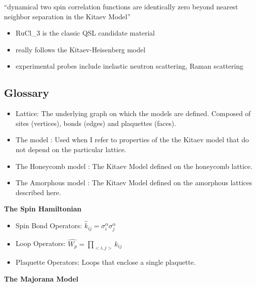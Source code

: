 ``dynamical two spin correlation functions are identically zero beyond nearest neighbor separation in the Kitaev Model''~\autocite{baskaranExactResultsSpin2007}

\begin{itemize}
\tightlist
\item
  RuCl\_3 is the classic QSL candidate material
\item
  really follows the Kitaev-Heisenberg model
\item
  experimental probes include inelastic neutron scattering, Raman scattering
\end{itemize}

\hypertarget{glossary}{%
\subsection{Glossary}\label{glossary}}

\begin{itemize}
\item
  Lattice: The underlying graph on which the models are defined. Composed of sites (vertices), bonds (edges) and plaquettes (faces).
\item
  The model : Used when I refer to properties of the the Kitaev model that do not depend on the particular lattice.
\item
  The Honeycomb model : The Kitaev Model defined on the honeycomb lattice.
\item
  The Amorphous model : The Kitaev Model defined on the amorphous lattices described here.
\end{itemize}

\textbf{The Spin Hamiltonian}

\begin{itemize}
\tightlist
\item
  Spin Bond Operators: \(\hat{k}_{ij} = \sigma_i^\alpha \sigma_j^\alpha\)
\item
  Loop Operators: \(\hat{W_p} = \prod_{<i,j>} k_{ij}\)
\item
  Plaquette Operators: Loops that enclose a single plaquette.
\end{itemize}

\textbf{The Majorana Model}

